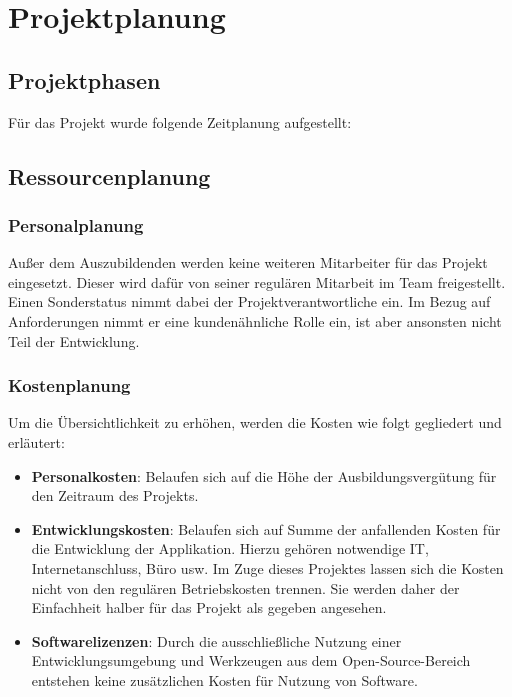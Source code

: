 \section{Projektplanung}
\label{sec:Projektplanung}

\subsection{Projektphasen}
\label{sec:Projektphasen}
Für das Projekt wurde folgende Zeitplanung aufgestellt:


\subsection{Ressourcenplanung}
\label{sec:Ressourcenplanung}
\subsubsection{Personalplanung}
\label{sec:Personalplanung}
Außer dem Auszubildenden werden keine weiteren Mitarbeiter für das Projekt eingesetzt. Dieser wird
dafür von seiner regulären Mitarbeit im Team freigestellt. Einen Sonderstatus nimmt dabei der
Projektverantwortliche ein. Im Bezug auf Anforderungen nimmt er eine kundenähnliche Rolle ein, ist
aber ansonsten nicht Teil der Entwicklung.
\subsubsection{Kostenplanung}
\label{sec:Kostenplanung}
Um die Übersichtlichkeit zu erhöhen, werden die Kosten wie folgt gegliedert und erläutert:
\begin{itemize}
	\item \textbf{Personalkosten}: Belaufen sich auf die Höhe der Ausbildungsvergütung für den Zeitraum des Projekts.
	\item \textbf{Entwicklungskosten}: Belaufen sich auf Summe der anfallenden Kosten für die Entwicklung der Applikation.
	Hierzu gehören notwendige IT, Internetanschluss, Büro usw. Im Zuge dieses Projektes lassen sich die Kosten nicht
	von den regulären Betriebskosten trennen. Sie werden daher der Einfachheit halber für das Projekt als gegeben
	angesehen.
	\item \textbf{Softwarelizenzen}: Durch die ausschließliche Nutzung einer Entwicklungsumgebung und Werkzeugen aus dem
	Open-Source-Bereich entstehen keine zusätzlichen Kosten für Nutzung von Software.
\end{itemize}

